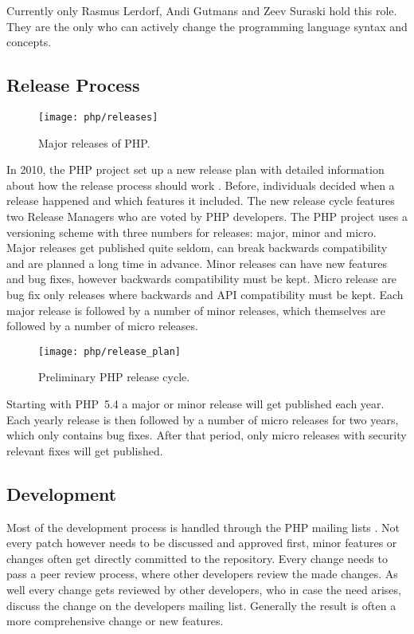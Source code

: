 Currently only Rasmus Lerdorf, Andi Gutmans and Zeev Suraski hold this role.
They are the only who can actively change the programming language syntax and
concepts.


\subsection{Release Process} %

\begin{figure}[bhtp]
  \centering
  \texttt{[image: php/releases]}
  \caption[Major Releases of PHP]{Major releases of PHP.}
\end{figure}

In 2010, the PHP project set up a new release plan with detailed information
about how the release process should work \cite{PHPRelease}. Before,
individuals decided when a release happened and which features it included. The
new release cycle features two Release Managers who are voted by PHP
developers. The PHP project uses a versioning scheme with three numbers for
releases: major, minor and micro. Major releases get published quite seldom,
can break backwards compatibility and are planned a long time in advance. Minor
releases can have new features and bug fixes, however backwards compatibility
must be kept. Micro release are bug fix only releases where backwards and
\ac{API} compatibility must be kept. Each major release is followed by a number
of minor releases, which themselves are followed by a number of micro releases.

\begin{figure}[thbp]
  \centering
  \texttt{[image: php/release\_plan]}
  \caption[Preliminary PHP Release Cycle]{Preliminary PHP release cycle.}
\end{figure}

Starting with PHP~5.4 a major or minor release will get published each year.
Each yearly release is then followed by a number of micro releases for two
years, which only contains bug fixes. After that period, only micro releases
with security relevant fixes will get published.


\subsection{Development} %

Most of the development process is handled through the PHP mailing lists
\cite{PHPRelease,Magnusson2010,PHPVoting}. Not every patch however needs to be
discussed and approved first, minor features or changes often get directly
committed to the repository. Every change needs to pass a peer review process,
where other developers review the made changes. As well every change gets
reviewed by other developers, who in case the need arises, discuss the change
on the developers mailing list. Generally the result is often a more
comprehensive change or new features.

